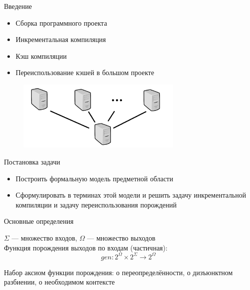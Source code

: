 

% 




{
	\begin{frame}
		\titlepage
	\end{frame}
}
\addtocounter{framenumber}{-1}

\begin{frame}{Введение}
\begin{itemize}
	\item Сборка программного проекта
	\item Инкрементальная компиляция
	\item Кэш компиляции
	\item Переиспользование кэшей в большом проекте
\end{itemize}
\begin{figure}[!h]
	\begin{center}
		\includegraphics[width=80mm]{network.png}
	\end{center}
\end{figure}
\end{frame}

\begin{frame}{Постановка задачи}
\begin{itemize}
	\item Построить формальную модель предметной области
	\item Сформулировать в терминах этой модели и решить задачу инкрементальной компиляции и задачу переиспользования порождений
\end{itemize}
\end{frame}

\begin{frame}{Основные определения}

$\Sigma$ --- множество входов, $\Omega$ --- множество выходов\\
Функция порождения выходов по входам (частичная):
$$gen : 2^\Omega \times 2^\Sigma \to 2^\Omega$$

\pause

Набор аксиом функции порождения: о переопределённости, о дизъюнктном разбиении, о необходимом контексте

\end{frame}

